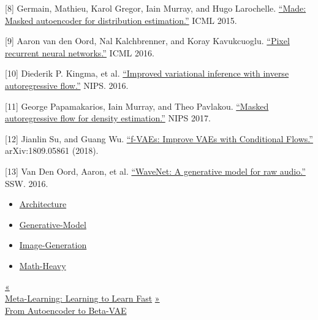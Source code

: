 {[}8{]} Germain, Mathieu, Karol Gregor, Iain Murray, and Hugo Larochelle. \href{https://arxiv.org/abs/1502.03509}{``Made: Masked autoencoder for distribution estimation.''} ICML 2015.

{[}9{]} Aaron van den Oord, Nal Kalchbrenner, and Koray Kavukcuoglu. \href{https://arxiv.org/abs/1601.06759}{``Pixel recurrent neural networks.''} ICML 2016.

{[}10{]} Diederik P. Kingma, et al. \href{https://arxiv.org/abs/1606.04934}{``Improved variational inference with inverse autoregressive flow.''} NIPS. 2016.

{[}11{]} George Papamakarios, Iain Murray, and Theo Pavlakou. \href{https://arxiv.org/abs/1705.07057}{``Masked autoregressive flow for density estimation.''} NIPS 2017.

{[}12{]} Jianlin Su, and Guang Wu. \href{https://arxiv.org/abs/1809.05861}{``f-VAEs: Improve VAEs with Conditional Flows.''} arXiv:1809.05861 (2018).

{[}13{]} Van Den Oord, Aaron, et al. \href{https://arxiv.org/abs/1609.03499}{``WaveNet: A generative model for raw audio.''} SSW. 2016.

\begin{itemize}
\tightlist
\item
  \href{https://lilianweng.github.io/tags/architecture/}{Architecture}
\item
  \href{https://lilianweng.github.io/tags/generative-model/}{Generative-Model}
\item
  \href{https://lilianweng.github.io/tags/image-generation/}{Image-Generation}
\item
  \href{https://lilianweng.github.io/tags/math-heavy/}{Math-Heavy}
\end{itemize}

\href{https://lilianweng.github.io/posts/2018-11-30-meta-learning/}{{« }\\
{Meta-Learning: Learning to Learn Fast}} \href{https://lilianweng.github.io/posts/2018-08-12-vae/}{{ »}\\
{From Autoencoder to Beta-VAE}}

